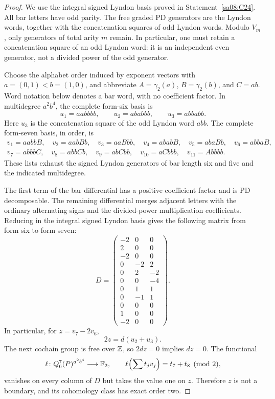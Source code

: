 \begin{proof}
We use the integral signed Lyndon basis proved in
Statement~\ref{sa08:C24}. All bar letters have odd parity.
The free graded PD generators are the Lyndon words, together
with the concatenation squares of odd Lyndon words. Modulo
$V_m$, only generators of total arity $m$ remain. In particular,
one must retain a concatenation square of an odd Lyndon word:
it is an independent even generator, not a divided power of
the odd generator.

Choose the alphabet order induced by exponent vectors with
$a=(0,1)<b=(1,0)$, and abbreviate
$A=\gamma_2(a)$, $B=\gamma_2(b)$, and $C=ab$.
Word notation below denotes a bar word, with no coefficient
factor. In multidegree $a^2b^4$, the complete form-six basis is
\[
 u_1=aabbbb,\qquad u_2=ababbb,\qquad u_3=abbabb.
\]
Here $u_3$ is the concatenation square of the odd Lyndon word
$abb$. The complete form-seven basis, in order, is
\[
\begin{gathered}
 v_1=aabbB,\quad v_2=aabBb,\quad v_3=aaBbb,\quad
 v_4=ababB,\quad v_5=abaBb,\quad v_6=abbaB,\\
 v_7=abbbC,\quad v_8=abbCb,\quad v_9=abCbb,\quad
 v_{10}=aCbbb,\quad v_{11}=Abbbb.
\end{gathered}
\]
These lists exhaust the signed Lyndon generators of bar
length six and five and the indicated multidegree.

The first term of the bar differential has a positive
coefficient factor and is PD decomposable. The remaining
differential merges adjacent letters with the ordinary
alternating signs and the divided-power multiplication
coefficients. Reducing in the integral signed Lyndon basis
gives the following matrix from form six to form seven:
\begin{equation}
 D=
 \begin{pmatrix}
 -2&0&0\\
  2&0&0\\
 -2&0&0\\
  0&-2&2\\
  0&2&-2\\
  0&0&-4\\
  0&1&1\\
  0&-1&1\\
  0&0&0\\
  1&0&0\\
 -2&0&0
 \end{pmatrix}.
 \tag{D-Q6}
\end{equation}
In particular, for $z=v_7-2v_6$,
\[
 2z=d(u_2+u_3).
\]
The next cochain group is free over $\mathbb Z$, so $2dz=0$
implies $dz=0$. The functional
\[
 \ell\colon Q_6^7(P)^{a^2b^4}\longrightarrow\mathbb F_2,
 \qquad \ell\Bigl(\sum t_jv_j\Bigr)=t_7+t_8\pmod2,
\]
vanishes on every column of $D$ but takes the value one on
$z$. Therefore $z$ is not a boundary, and its cohomology
class has exact order two.


\end{proof}
